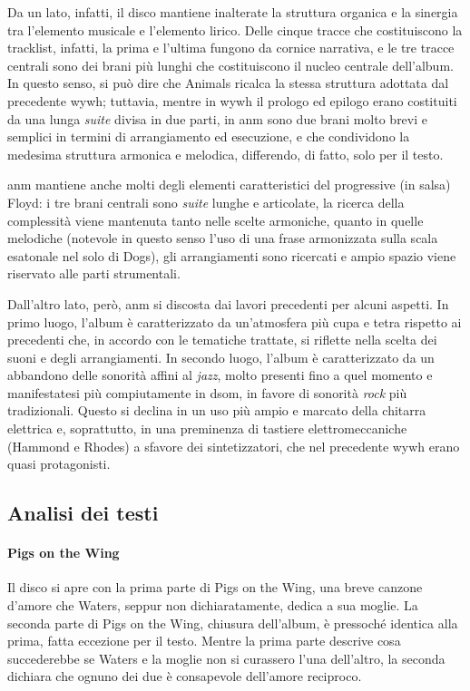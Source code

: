 \documentclass[class=book, crop=false, oneside, 12pt]{standalone}
\begin{document}
    Da un lato, infatti, il disco mantiene inalterate la struttura organica e la sinergia tra l'elemento musicale e l'elemento lirico. Delle cinque tracce che costituiscono la tracklist, infatti, la prima e l'ultima fungono  da cornice narrativa, e le tre tracce centrali sono dei brani più lunghi che costituiscono il nucleo centrale dell'album. In questo senso, si può dire che Animals ricalca la stessa struttura adottata dal precedente \acrlong{wywh}; tuttavia, mentre in \acrshort{wywh} il prologo ed epilogo erano costituiti da una lunga \emph{suite} divisa in due parti, in \acrshort{anm} sono due brani molto brevi e semplici in termini di arrangiamento ed esecuzione, e che condividono la medesima struttura armonica e melodica, differendo, di fatto, solo per il testo. 

    \acrshort{anm} mantiene anche molti degli elementi caratteristici del progressive (in salsa) Floyd: i tre brani centrali sono \emph{suite} lunghe e articolate, la ricerca della complessità viene mantenuta tanto nelle scelte armoniche, quanto in quelle melodiche (notevole in questo senso l'uso di una frase armonizzata sulla scala esatonale nel solo di Dogs), gli arrangiamenti sono ricercati e ampio spazio viene riservato alle parti strumentali.

    Dall'altro lato, però, \acrshort{anm} si discosta dai lavori precedenti per alcuni aspetti. In primo luogo, l'album è caratterizzato da un'atmosfera più cupa e tetra rispetto ai precedenti che, in accordo con le tematiche trattate, si riflette nella scelta dei suoni e degli arrangiamenti. In secondo luogo, l'album è caratterizzato da un abbandono delle sonorità affini al \emph{jazz}, molto presenti fino a quel momento e manifestatesi più compiutamente in \acrshort{dsom}, in favore di sonorità \emph{rock} più tradizionali. Questo si declina  in un uso più ampio e marcato della chitarra elettrica e, soprattutto, in una preminenza di tastiere elettromeccaniche (Hammond e Rhodes) a sfavore dei sintetizzatori, che nel precedente \acrshort{wywh} erano quasi protagonisti.



    \subsection{Analisi dei testi}
    \label{subsec:animals-lyrics}

    \paragraph{Pigs on the Wing}
    Il disco si apre con la prima parte di Pigs on the Wing, una breve canzone d'amore che Waters, seppur non dichiaratamente, dedica a sua moglie. La seconda parte di Pigs on the Wing, chiusura dell'album, è pressoché  identica alla prima, fatta eccezione per il testo. Mentre la prima parte descrive cosa succederebbe se Waters e la moglie non si curassero l'una dell'altro, la seconda dichiara che ognuno dei due è consapevole dell'amore reciproco. 
\end{document}
